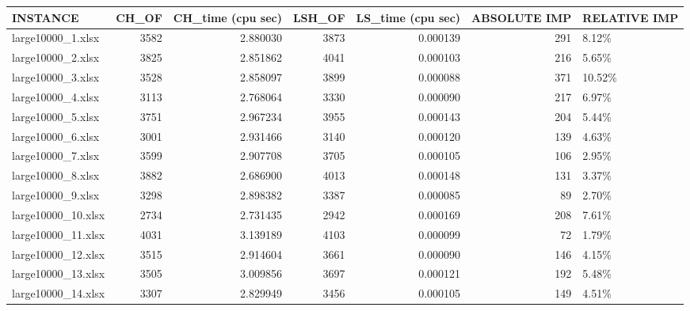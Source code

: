 \documentclass[11pt, a4paper]{article}
\begin{document}
\begin{table}[h!]
	\centering
	\begin{adjustbox}{max width=\textwidth}
	\begin{tabular}{lrrrrrl}
		\toprule
				   INSTANCE &  CH\_OF &  CH\_time (cpu sec) &  LSH\_OF &  LS\_time (cpu sec) &  ABSOLUTE IMP & RELATIVE IMP \\
		\midrule
		  large10000\_1.xlsx &   3582 &           2.880030 &    3873 &           0.000139 &           291 &        8.12\% \\
		  large10000\_2.xlsx &   3825 &           2.851862 &    4041 &           0.000103 &           216 &        5.65\% \\
		  large10000\_3.xlsx &   3528 &           2.858097 &    3899 &           0.000088 &           371 &       10.52\% \\
		  large10000\_4.xlsx &   3113 &           2.768064 &    3330 &           0.000090 &           217 &        6.97\% \\
		  large10000\_5.xlsx &   3751 &           2.967234 &    3955 &           0.000143 &           204 &        5.44\% \\
		  large10000\_6.xlsx &   3001 &           2.931466 &    3140 &           0.000120 &           139 &        4.63\% \\
		  large10000\_7.xlsx &   3599 &           2.907708 &    3705 &           0.000105 &           106 &        2.95\% \\
		  large10000\_8.xlsx &   3882 &           2.686900 &    4013 &           0.000148 &           131 &        3.37\% \\
		  large10000\_9.xlsx &   3298 &           2.898382 &    3387 &           0.000085 &            89 &        2.70\% \\
		 large10000\_10.xlsx &   2734 &           2.731435 &    2942 &           0.000169 &           208 &        7.61\% \\
		 large10000\_11.xlsx &   4031 &           3.139189 &    4103 &           0.000099 &            72 &        1.79\% \\
		 large10000\_12.xlsx &   3515 &           2.914604 &    3661 &           0.000090 &           146 &        4.15\% \\
		 large10000\_13.xlsx &   3505 &           3.009856 &    3697 &           0.000121 &           192 &        5.48\% \\
		 large10000\_14.xlsx &   3307 &           2.829949 &    3456 &           0.000105 &           149 &        4.51\% \\

\end{tabular}
\end{adjustbox}
\end{table}
\end{document}
